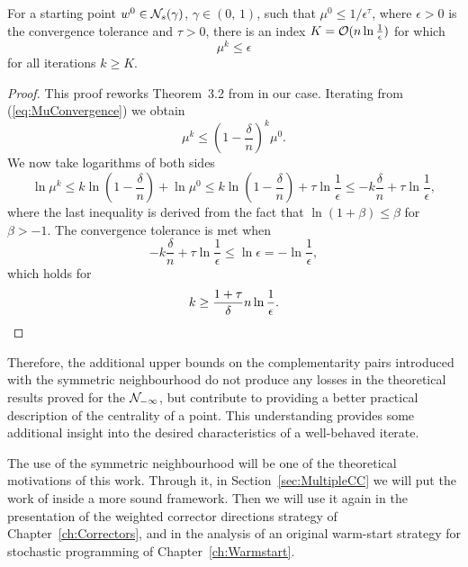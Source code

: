 \begin{theorem}
For a starting point $w^0 \in \mathcal{N}_s(\gamma)$, $\gamma \in (0,\, 1)$,
such that $\mu^0 \le 1/\epsilon^\tau$,
where $\epsilon > 0$ is the convergence tolerance and $\tau > 0$,
there is an index $K = \mathcal{O}(n \ln \frac{1}{\epsilon})$ for which
\[
  \mu^k \le \epsilon
\]
for all iterations $k \ge K$.
\end{theorem}
%
\begin{proof}
This proof reworks Theorem~3.2 from \cite{ipm:Wright97} in our case.
Iterating from (\ref{eq:MuConvergence}) we obtain
\[
  \mu^k \le \left( 1 -\frac{\delta}{n} \right)^k \mu^0.
\]
We now take logarithms of both sides
\[
  \ln\mu^k \le k \ln\left( 1 -\frac{\delta}{n} \right) + \ln\mu^0
           \le k \ln\left( 1 -\frac{\delta}{n} \right) + 
               \tau \ln\frac{1}{\epsilon}
           \le - k \frac{\delta}{n} + \tau \ln\frac{1}{\epsilon},
\]
where the last inequality is derived from the fact that
$\ln(1 + \beta) \le \beta$ for $\beta > -1$.
The convergence tolerance is met when
\[
   - k \frac{\delta}{n} + \tau \ln\frac{1}{\epsilon} \le \ln \epsilon
       = -\ln \frac{1}{\epsilon},
\]
which holds for
\[
  k \ge \frac{1 + \tau}{\delta} n \ln \frac{1}{\epsilon}.
  \qedhere
\]
\end{proof}

Therefore, the additional upper bounds on the complementarity pairs
introduced with the symmetric neighbourhood do not produce any losses
in the theoretical results proved for the $\mathcal{N}_{-\infty}$, but 
contribute to providing a better practical description of
the centrality of a point.
This understanding provides some additional 
insight into the desired characteristics of a well-behaved iterate.

The use of the symmetric neighbourhood will be one of the theoretical
motivations of this work. Through it, in Section~\ref{sec:MultipleCC}
we will put the work of \cite{Gondzio96} inside a more sound framework.
Then we will use it again in the presentation of the weighted corrector
directions strategy of Chapter~\ref{ch:Correctors}, and in the analysis of an 
original warm-start strategy for stochastic programming of 
Chapter~\ref{ch:Warmstart}.
